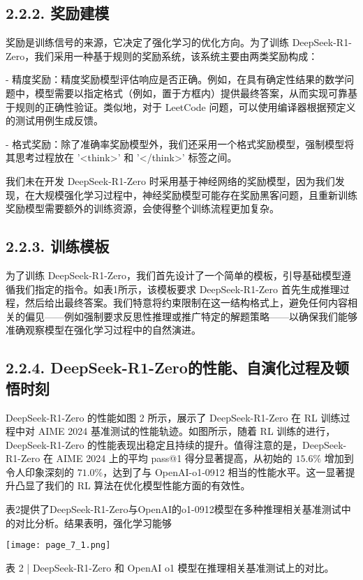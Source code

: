 \documentclass[12pt,a4paper]{report} %
\begin{document}
\subsection*{2.2.2. 奖励建模}


奖励是训练信号的来源，它决定了强化学习的优化方向。为了训练 DeepSeek-R1-Zero，我们采用一种基于规则的奖励系统，该系统主要由两类奖励构成：


- 精度奖励：精度奖励模型评估响应是否正确。例如，在具有确定性结果的数学问题中，模型需要以指定格式（例如，置于方框内）提供最终答案，从而实现可靠基于规则的正确性验证。类似地，对于 LeetCode 问题，可以使用编译器根据预定义的测试用例生成反馈。


- 格式奖励：除了准确率奖励模型外，我们还采用一个格式奖励模型，强制模型将其思考过程放在 '\textless{}think\textgreater{}' 和 '\textless{}/think\textgreater{}' 标签之间。


我们未在开发 DeepSeek-R1-Zero 时采用基于神经网络的奖励模型，因为我们发现，在大规模强化学习过程中，神经奖励模型可能存在奖励黑客问题，且重新训练奖励模型需要额外的训练资源，会使得整个训练流程更加复杂。


\subsection*{2.2.3. 训练模板}


为了训练 DeepSeek-R1-Zero，我们首先设计了一个简单的模板，引导基础模型遵循我们指定的指令。如表1所示，该模板要求 DeepSeek-R1-Zero 首先生成推理过程，然后给出最终答案。我们特意将约束限制在这一结构格式上，避免任何内容相关的偏见——例如强制要求反思性推理或推广特定的解题策略——以确保我们能够准确观察模型在强化学习过程中的自然演进。


\subsection*{2.2.4. DeepSeek-R1-Zero的性能、自演化过程及顿悟时刻}


DeepSeek-R1-Zero 的性能如图 2 所示，展示了 DeepSeek-R1-Zero 在 RL 训练过程中对 AIME 2024 基准测试的性能轨迹。如图所示，随着 RL 训练的进行，DeepSeek-R1-Zero 的性能表现出稳定且持续的提升。值得注意的是，DeepSeek-R1-Zero 在 AIME 2024 上的平均 pass@1 得分显著提高，从初始的 $15.6 \%$ 增加到令人印象深刻的 $71.0 \%$，达到了与 OpenAI-o1-0912 相当的性能水平。这一显著提升凸显了我们的 RL 算法在优化模型性能方面的有效性。


表2提供了DeepSeek-R1-Zero与OpenAI的o1-0912模型在多种推理相关基准测试中的对比分析。结果表明，强化学习能够
\begin{center}
\texttt{[image: page\_7\_1.png]}
\end{center}
\begin{center}
表 2 | DeepSeek-R1-Zero 和 OpenAI o1 模型在推理相关基准测试上的对比。
\end{center}
\end{document}
